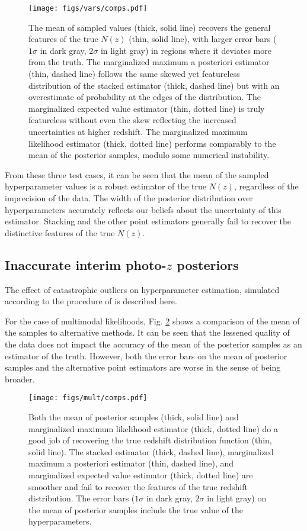 \begin{figure}
	\texttt{[image: figs/vars/comps.pdf]}
	\caption{The mean of sampled values (thick, solid line) recovers the general 
		features of the true $N(z)$ (thin, solid line), with larger error bars 
		($1\sigma$ in dark gray, $2\sigma$ in light gray) in regions where it deviates 
		more from the truth.  The marginalized maximum a posteriori estimator (thin, 
		dashed line) follows the same skewed yet featureless distribution of the 
		stacked estimator (thick, dashed line) but with an overestimate of probability 
		at the edges of the distribution.  The marginalized expected value estimator 
		(thin, dotted line) is truly featureless without even the skew reflecting the 
		increased uncertainties at higher redshift.  The marginalized maximum 
		likelihood estimator (thick, dotted line) performs comparably to the mean of 
		the posterior samples, modulo some numerical instability.}
	\label{fig:vars-comp}
\end{figure}

From these three test cases, it can be seen that the mean of the sampled 
hyperparameter values is a robust estimator of the true $N(z)$, regardless of 
the imprecision of the data.  The width of the posterior distribution over 
hyperparameters accurately reflects our beliefs about the uncertainty of this 
estimator.  Stacking and the other point estimators generally fail to recover 
the distinctive features of the true $N(z)$.

\subsection{Inaccurate interim photo-$z$ posteriors}

The effect of catastrophic outliers on hyperparameter estimation, simulated 
according to the procedure of  is described here.  

For the case of multimodal likelihoods, Fig. \ref{fig:multi-comp} shows a 
comparison of the mean of the samples to alternative methods.  It can be seen 
that the lessened quality of the data does not impact the accuracy of the mean 
of the posterior samples as an estimator of the truth.  However, both the error 
bars on the mean of posterior samples and the alternative point estimators are 
worse in the sense of being broader.

\begin{figure}
	\texttt{[image: figs/mult/comps.pdf]}
	\caption{Both the mean of posterior samples (thick, solid line) and 
		marginalized maximum likelihood estimator (thick, dotted line) do a good job of 
		recovering the true redshift distribution function (thin, solid line).  The 
		stacked estimator (thick, dashed line), marginalized maximum a posteriori 
		estimator (thin, dashed line), and marginalized expected value estimator 
		(thick, dotted line) are smoother and fail to recover the features of the true 
		redshift distribution.  The error bars ($1\sigma$ in dark gray, $2\sigma$ in 
		light gray) on the mean of posterior samples include the true value of the 
		hyperparameters.}
	\label{fig:multi-comp}
\end{figure}

